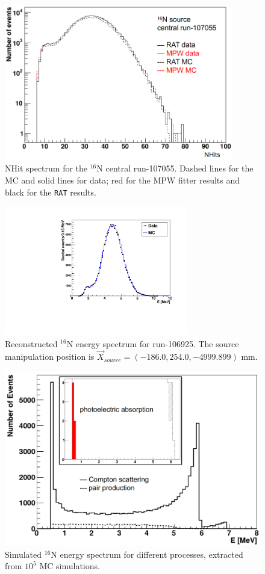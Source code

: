 \begin{figure}[htbp]
	\centering
	\includegraphics[width=10cm]{N16_nhits_107055.png}
	\caption[NHit spectrum for the $^{16}$N central run-107055.]{NHit spectrum for the $^{16}$N central run-107055. Dashed lines for the MC and solid lines for data; red for the MPW fitter results and black for the \texttt{RAT} results.}
	\label{N16nhits}
\end{figure}

\begin{figure}[htbp]
	\centering
	\includegraphics[width=8cm]{N16energyMPWcompare_106925.pdf}
	\caption[Reconstructed $^{16}$N energy spectrum for run-106925.]{Reconstructed $^{16}$N energy spectrum for run-106925. The source manipulation position is $\vec{X}_{source}=(-186.0,254.0,-4999.899)$ mm.}
	\label{N16_106925}
\end{figure}

\begin{figure}[htbp]
	\centering
	\includegraphics[width=12cm]{N16_MCenergySpectrum.png}
	\caption[Simulated $^{16}$N energy spectrum for different processes.]{Simulated $^{16}$N energy spectrum for different processes, extracted from $10^5$ MC simulations.}
	\label{N16nhitsSimu}
\end{figure}


